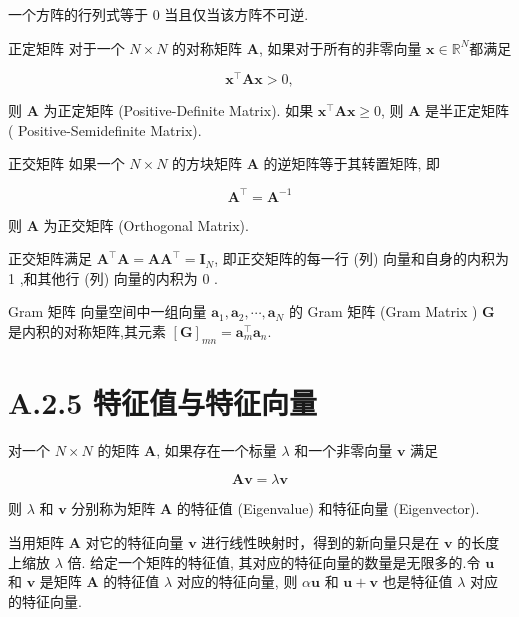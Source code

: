 \documentclass[10pt]{article}
\begin{document}
一个方阵的行列式等于 0 当且仅当该方阵不可逆.

正定矩阵 对于一个 $N \times N$ 的对称矩阵 $\boldsymbol{A}$, 如果对于所有的非零向量 $\boldsymbol{x} \in \mathbb{R}^{N}$都满足


\begin{equation*}
\boldsymbol{x}^{\top} \boldsymbol{A x}>0, \tag{A.37}
\end{equation*}


则 $\boldsymbol{A}$ 为正定矩阵 (Positive-Definite Matrix). 如果 $\boldsymbol{x}^{\top} \boldsymbol{A x} \geq 0$, 则 $\boldsymbol{A}$ 是半正定矩阵 ( Positive-Semidefinite Matrix).

正交矩阵 如果一个 $N \times N$ 的方块矩阵 $\boldsymbol{A}$ 的逆矩阵等于其转置矩阵, 即


\begin{equation*}
\boldsymbol{A}^{\top}=\boldsymbol{A}^{-1} \tag{A.38}
\end{equation*}


则 $\boldsymbol{A}$ 为正交矩阵 (Orthogonal Matrix).

正交矩阵满足 $\boldsymbol{A}^{\top} \boldsymbol{A}=\boldsymbol{A} \boldsymbol{A}^{\top}=\boldsymbol{I}_{N}$, 即正交矩阵的每一行 (列) 向量和自身的内积为 1 ,和其他行 (列) 向量的内积为 0 .

Gram 矩阵 向量空间中一组向量 $\boldsymbol{a}_{1}, \boldsymbol{a}_{2}, \cdots, \boldsymbol{a}_{N}$ 的 Gram 矩阵 (Gram Matrix ) $\boldsymbol{G}$ 是内积的对称矩阵,其元素 $[\boldsymbol{G}]_{m n}=\boldsymbol{a}_{m}^{\top} \boldsymbol{a}_{n}$.

\section*{A.2.5 特征值与特征向量}
对一个 $N \times N$ 的矩阵 $\boldsymbol{A}$, 如果存在一个标量 $\lambda$ 和一个非零向量 $\boldsymbol{v}$ 满足


\begin{equation*}
\boldsymbol{A v}=\lambda \boldsymbol{v} \tag{A.39}
\end{equation*}


则 $\lambda$ 和 $\boldsymbol{v}$ 分别称为矩阵 $\boldsymbol{A}$ 的特征值 (Eigenvalue) 和特征向量 (Eigenvector).

当用矩阵 $\boldsymbol{A}$ 对它的特征向量 $\boldsymbol{v}$ 进行线性映射时，得到的新向量只是在 $\boldsymbol{v}$ 的长度上缩放 $\lambda$ 倍. 给定一个矩阵的特征值, 其对应的特征向量的数量是无限多的.令 $\boldsymbol{u}$ 和 $\boldsymbol{v}$ 是矩阵 $\boldsymbol{A}$ 的特征值 $\lambda$ 对应的特征向量, 则 $\alpha \boldsymbol{u}$ 和 $\boldsymbol{u}+\boldsymbol{v}$ 也是特征值 $\lambda$ 对应的特征向量.
\end{document}
